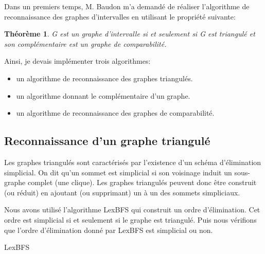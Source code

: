 \documentclass[12pt, a4paper]{report}
\newtheorem{theorem}{Théorème}
\begin{document}
	Dans un premiers temps, M. Baudon m'a demandé de réaliser l'algorithme de reconnaissance des graphes d'intervalles en utilisant le propriété suivante:
\begin{theorem}
G est un graphe d'intervalle si et seulement si G est triangulé et son complémentaire est un graphe de comparabilité.\cite{GH64}\\
\end{theorem}
	
	Ainsi, je devais implémenter trois algorithmes:
	\begin{itemize}
	\item un algorithme de reconnaissance des graphes triangulés.
	\item un algorithme donnant le complémentaire d'un graphe.
	\item un algorithme de reconnaissance des graphes de comparabilité.
	\end{itemize}
	\subsection{Reconnaissance d'un graphe triangulé}
	
	Les graphes triangulés sont caractérisés par l'existence d'un schéma d'élimination simplicial. On dit qu'un sommet est simplicial si son voisinage induit un sous-graphe complet (une clique). Les graphes triangulés peuvent donc être construit (ou réduit) en ajoutant (ou supprimant) un à un des sommets simpliciaux.
	
	Nous avons utilisé l'algorithme LexBFS qui construit un ordre d'élimination. Cet ordre est simplicial si et seulement si le graphe est triangulé. Puis nous vérifions que l'ordre d'élimination donné par LexBFS est simplicial ou non.

\begin{algorithm}[H]
	\caption{LexBFS~\cite{PV}}
\end{algorithm}
\end{document}
